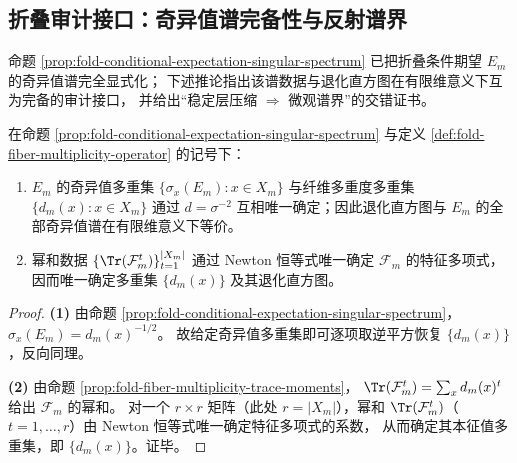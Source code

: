 \subsection{折叠审计接口：奇异值谱完备性与反射谱界}\label{subsec:op-algebra-fold-audit-spectrum}
命题 \ref{prop:fold-conditional-expectation-singular-spectrum} 已把折叠条件期望 \(E_m\) 的奇异值谱完全显式化；
下述推论指出该谱数据与退化直方图在有限维意义下互为完备的审计接口，
并给出“稳定层压缩 \(\Rightarrow\) 微观谱界”的交错证书。

\begin{corollary}\label{cor:fold-conditional-expectation-spectrum-histogram}
在命题 \ref{prop:fold-conditional-expectation-singular-spectrum} 与定义 \ref{def:fold-fiber-multiplicity-operator} 的记号下：
\begin{enumerate}
  \item \(E_m\) 的奇异值多重集 \(\{\sigma_x(E_m):x\in X_m\}\) 与纤维多重度多重集 \(\{d_m(x):x\in X_m\}\) 通过 \(d=\sigma^{-2}\) 互相唯一确定；因此退化直方图与 \(E_m\) 的全部奇异值谱在有限维意义下等价。
  \item 幂和数据 \(\{\Tr(\mathcal{F}_m^{t})\}_{t=1}^{|X_m|}\) 通过 Newton 恒等式唯一确定 \(\mathcal{F}_m\) 的特征多项式，因而唯一确定多重集 \(\{d_m(x)\}\) 及其退化直方图。
\end{enumerate}
\end{corollary}
\begin{proof}
\textbf{(1)} 由命题 \ref{prop:fold-conditional-expectation-singular-spectrum}，
\(\sigma_x(E_m)=d_m(x)^{-1/2}\)。
故给定奇异值多重集即可逐项取逆平方恢复 \(\{d_m(x)\}\)，反向同理。
\par
\textbf{(2)} 由命题 \ref{prop:fold-fiber-multiplicity-trace-moments}，
\(\Tr(\mathcal{F}_m^{t})=\sum_x d_m(x)^{t}\) 给出 \(\mathcal{F}_m\) 的幂和。
对一个 \(r\times r\) 矩阵（此处 \(r=|X_m|\)），幂和 \(\Tr(\mathcal{F}_m^{t})\)（\(t=1,\dots,r\)）由 Newton 恒等式唯一确定特征多项式的系数，
从而确定其本征值多重集，即 \(\{d_m(x)\}\)。证毕。
\end{proof}

